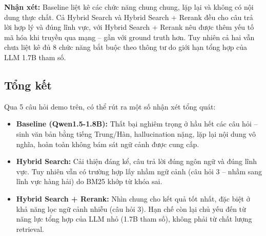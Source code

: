 \textbf{Nhận xét:} Baseline liệt kê các chức năng chung chung, lặp lại và không có nội dung thực chất. Cả Hybrid Search và Hybrid Search + Rerank đều cho câu trả lời hợp lý và đúng lĩnh vực, với Hybrid Search + Rerank nêu được thêm yếu tố mã hóa khi truyền qua mạng -- gần với ground truth hơn. Tuy nhiên cả hai vẫn chưa liệt kê đủ 8 chức năng bắt buộc theo thông tư do giới hạn tổng hợp của LLM 1.7B tham số.

\subsection*{Tổng kết}

Qua 5 câu hỏi demo trên, có thể rút ra một số nhận xét tổng quát:

\begin{itemize}
    \item \textbf{Baseline (Qwen1.5-1.8B):} Thất bại nghiêm trọng ở hầu hết các câu hỏi -- sinh văn bản bằng tiếng Trung/Hàn, hallucination nặng, lặp lại nội dung vô nghĩa, hoàn toàn không bám sát ngữ cảnh được cung cấp.
    \item \textbf{Hybrid Search:} Cải thiện đáng kể, câu trả lời đúng ngôn ngữ và đúng lĩnh vực. Tuy nhiên vẫn có trường hợp lấy nhầm ngữ cảnh (câu hỏi 3 -- nhầm sang lĩnh vực hàng hải) do BM25 khớp từ khóa sai.
    \item \textbf{Hybrid Search + Rerank:} Nhìn chung cho kết quả tốt nhất, đặc biệt ở khả năng lọc ngữ cảnh nhiễu (câu hỏi 3). Hạn chế còn lại chủ yếu đến từ năng lực tổng hợp của LLM nhỏ (1.7B tham số), không phải từ chất lượng retrieval.
\end{itemize}